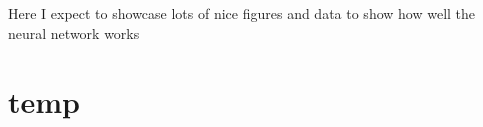 
Here I expect to showcase lots of nice figures and data to show how well the neural network works

\section{temp}